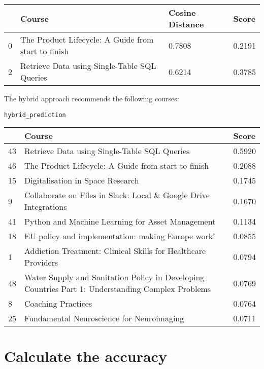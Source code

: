 \begin{table}[H]
\small
\begin{tabular}{|p{0.5cm}|p{10cm}|p{1.5cm}|p{1.5cm}|}
\hline
& Course & Cosine Distance & Score \\
\hline
0 & The Product Lifecycle: A Guide from start to finish & 0.7808 & 0.2191 \\
2 & Retrieve Data using Single-Table SQL Queries & 0.6214 & 0.3785 \\
\hline
\end{tabular}
\end{table}

\noindent The hybrid approach recommends the following courses:

\begin{verbatim}
hybrid_prediction
\end{verbatim}

\begin{table}[H]
\small
\begin{tabular}{|p{0.5cm}|p{10cm}|p{1.5cm}|}
\hline
& Course & Score \\
\hline
43 & Retrieve Data using Single-Table SQL Queries & 0.5920 \\
46 & The Product Lifecycle: A Guide from start to finish & 0.2088 \\
15 & Digitalisation in Space Research & 0.1745 \\
9 & Collaborate on Files in Slack: Local \& Google Drive Integrations & 0.1670 \\
41 & Python and Machine Learning for Asset Management & 0.1134 \\
18 & EU policy and implementation: making Europe work! & 0.0855 \\
1 & Addiction Treatment: Clinical Skills for Healthcare Providers & 0.0794 \\
48 & Water Supply and Sanitation Policy in Developing Countries Part 1: Understanding Complex Problems & 0.0769 \\
8 & Coaching Practices & 0.0764 \\
25 & Fundamental Neuroscience for Neuroimaging & 0.0711 \\
\hline
\end{tabular}
\end{table}

\section{Calculate the accuracy}

